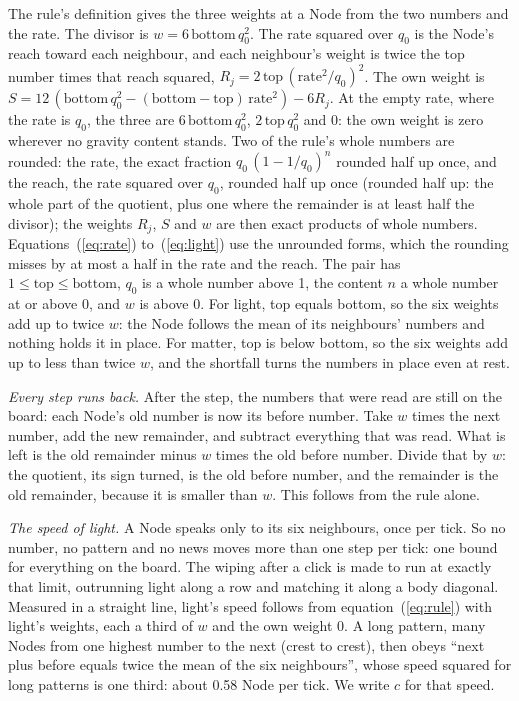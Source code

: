 \documentclass[pdflatex,sn-mathphys-num]{sn-jnl}
\begin{document}
The rule's definition gives the three weights at a Node from the two numbers and the rate. The divisor is $w = 6\,\mathrm{bottom}\,q_0^2$. The rate squared over $q_0$ is the Node's reach toward each neighbour, and each neighbour's weight is twice the top number times that reach squared, $R_j = 2\,\mathrm{top}\,(\mathrm{rate}^2/q_0)^2$. The own weight is $S = 12\,(\mathrm{bottom}\,q_0^2 - (\mathrm{bottom} - \mathrm{top})\,\mathrm{rate}^2) - 6R_j$. At the empty rate, where the rate is $q_0$, the three are $6\,\mathrm{bottom}\,q_0^2$, $2\,\mathrm{top}\,q_0^2$ and 0: the own weight is zero wherever no gravity content stands. Two of the rule's whole numbers are rounded: the rate, the exact fraction $q_0\,(1 - 1/q_0)^n$ rounded half up once, and the reach, the rate squared over $q_0$, rounded half up once (rounded half up: the whole part of the quotient, plus one where the remainder is at least half the divisor); the weights $R_j$, $S$ and $w$ are then exact products of whole numbers. Equations~(\ref{eq:rate}) to~(\ref{eq:light}) use the unrounded forms, which the rounding misses by at most a half in the rate and the reach. The pair has $1 \le \mathrm{top} \le \mathrm{bottom}$, $q_0$ is a whole number above 1, the content $n$ a whole number at or above 0, and $w$ is above 0. For light, top equals bottom, so the six weights add up to twice $w$: the Node follows the mean of its neighbours' numbers and nothing holds it in place. For matter, top is below bottom, so the six weights add up to less than twice $w$, and the shortfall turns the numbers in place even at rest.

\textit{Every step runs back.} After the step, the numbers that were read are still on the board: each Node's old number is now its before number. Take $w$ times the next number, add the new remainder, and subtract everything that was read. What is left is the old remainder minus $w$ times the old before number. Divide that by $w$: the quotient, its sign turned, is the old before number, and the remainder is the old remainder, because it is smaller than $w$. This follows from the rule alone.

\textit{The speed of light.} A Node speaks only to its six neighbours, once per tick. So no number, no pattern and no news moves more than one step per tick: one bound for everything on the board. The wiping after a click is made to run at exactly that limit, outrunning light along a row and matching it along a body diagonal. Measured in a straight line, light's speed follows from equation~(\ref{eq:rule}) with light's weights, each a third of $w$ and the own weight 0. A long pattern, many Nodes from one highest number to the next (crest to crest), then obeys ``next plus before equals twice the mean of the six neighbours'', whose speed squared for long patterns is one third: about 0.58 Node per tick. We write $c$ for that speed.
\end{document}
